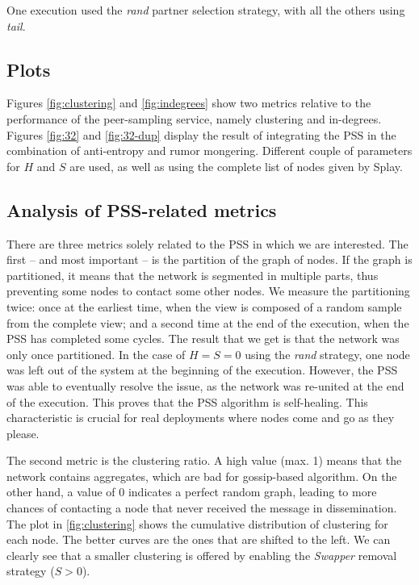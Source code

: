 \documentclass[11pt,a4paper]{scrartcl}
\begin{document}
One execution used the \textit{rand} partner selection strategy, with all the others using \textit{tail}.

\subsection{Plots}

Figures \ref{fig:clustering} and \ref{fig:indegrees} show two metrics relative to the performance of the peer-sampling service, namely clustering and in-degrees. Figures \ref{fig:32} and \ref{fig:32-dup} display the result of integrating the PSS in the combination of anti-entropy and rumor mongering. Different couple of parameters for $H$ and $S$ are used, as well as using the complete list of nodes given by Splay.

\subsection{Analysis of PSS-related metrics}

There are three metrics solely related to the PSS in which we are interested. The first -- and most important -- is the partition of the graph of nodes. If the graph is partitioned, it means that the network is segmented in multiple parts, thus preventing some nodes to contact some other nodes. We measure the partitioning twice: once at the earliest time, when the view is composed of a random sample from the complete view; and a second time at the end of the execution, when the PSS has completed some cycles. The result that we get is that the network was only once partitioned. In the case of $H=S=0$ using the \textit{rand} strategy, one node was left out of the system at the beginning of the execution. However, the PSS was able to eventually resolve the issue, as the network was re-united at the end of the execution. This proves that the PSS algorithm is self-healing. This characteristic is crucial for real deployments where nodes come and go as they please.

The second metric is the clustering ratio. A high value (max. 1) means that the network contains aggregates, which are bad for gossip-based algorithm. On the other hand, a value of 0 indicates a perfect random graph, leading to more chances of contacting a node that never received the message in dissemination. The plot in \autoref{fig:clustering} shows the cumulative distribution of clustering for each node. The better curves are the ones that are shifted to the left. We can clearly see that a smaller clustering is offered by enabling the \textit{Swapper} removal strategy ($S>0$).
\end{document}
